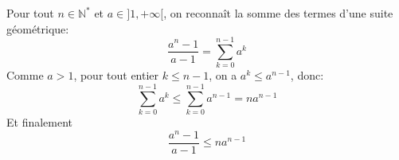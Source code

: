 Pour tout $n\in\mathbb{N}^*$ et $a\in]1,+\infty[$, on reconnaît la somme des termes d'une suite géométrique:
\[
\frac{a^n-1}{a-1} = \sum_{k=0}^{n-1}{a^k}
\]
Comme $a>1$, pour tout entier $k\leq n-1$, on a $a^k\leq a^{n-1}$, donc:
\[
\sum_{k=0}^{n-1}{a^k} \leq \sum_{k=0}^{n-1}{a^{n-1}} = na^{n-1}
\] 
Et finalement
\[
\frac{a^n-1}{a-1}  \leq na^{n-1}
\] 

